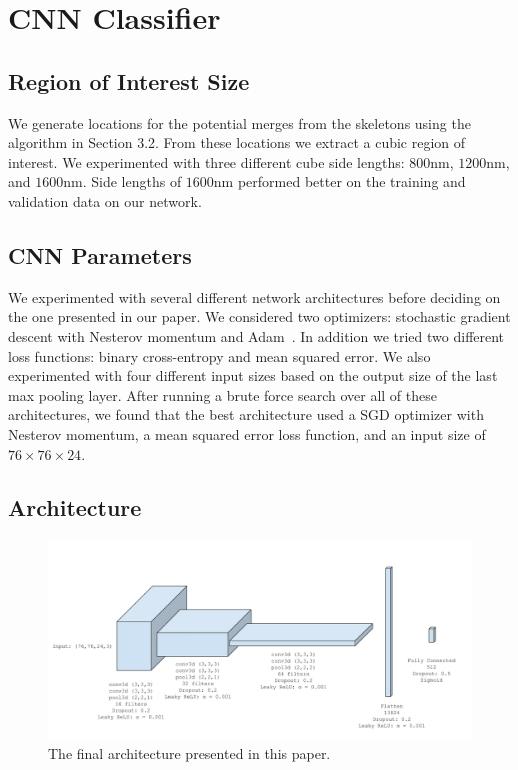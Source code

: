 \section{CNN Classifier}

\subsection{Region of Interest Size}

We generate locations for the potential merges from the skeletons using the algorithm in Section 3.2.
From these locations we extract a cubic region of interest.
We experimented with three different cube side lengths: $800 \textrm{nm}$, $1200 \textrm{nm}$, and $1600 \textrm{nm}$. 
Side lengths of $1600 \textrm{nm}$ performed better on the training and validation data on our network. 

\subsection{CNN Parameters}

We experimented with several different network architectures before deciding on the one presented in our paper. 
We considered two optimizers: stochastic gradient descent with Nesterov momentum and Adam~\cite{kingma2014adam}.
In addition we tried two different loss functions: binary cross-entropy and mean squared error.
We also experimented with four different input sizes based on the output size of the last max pooling layer.
After running a brute force search over all of these architectures, we found that the best architecture used a SGD optimizer with Nesterov momentum, a mean squared error loss function, and an input size of $76 \times 76 \times 24$. 

\subsection{Architecture}

\begin{figure}
	\centering
	\includegraphics[width=0.9\linewidth]{./figures/architecture.png}
	\caption{The final architecture presented in this paper.}
	\label{fig:architecture}
\end{figure}

